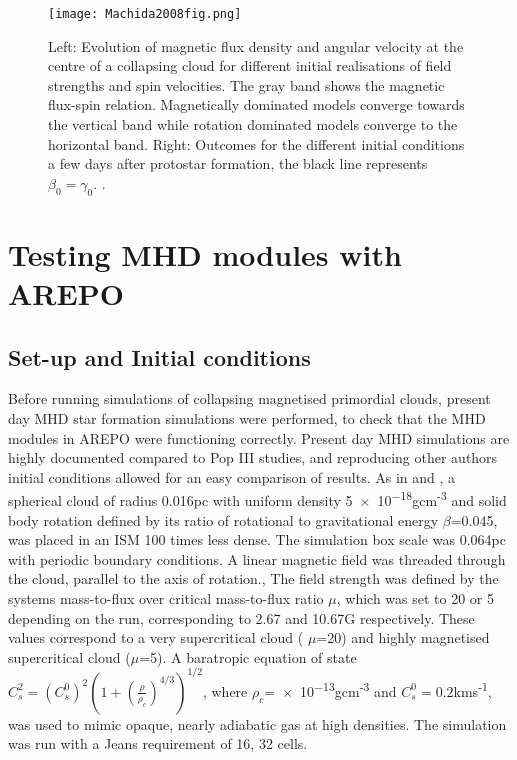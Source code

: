 \documentclass[11pt]{article}
\begin{document}
\begin{figure}[h!]
         \centering
		\texttt{[image: Machida2008fig.png]}
		\caption{Left: Evolution of magnetic flux density and angular velocity at the centre of a collapsing cloud for different initial realisations of field strengths and spin velocities. The gray band shows the magnetic flux-spin relation. Magnetically dominated models converge towards the vertical band while rotation dominated models converge to the horizontal band. Right: Outcomes for the different initial conditions a few days after protostar formation, the black line represents $\beta_{0}=\gamma_{0}$. \citep{Machida2008a}.}
		\label{fig:Machidafig}
\end{figure}





\section{Testing MHD modules with AREPO}
\label{MHDtest}
\subsection{Set-up and Initial conditions}
\label{sub:ics1}
Before running simulations of collapsing magnetised primordial clouds, present day MHD star formation simulations were performed, to check that the MHD modules in AREPO were functioning correctly. Present day MHD simulations are highly documented compared to Pop III studies, and reproducing other authors  initial conditions allowed for an easy comparison of results. As in \cite{Hennebelle2008} and \cite{Burzle2011}, a spherical cloud of radius 0.016pc with uniform density \num{5e-18}gcm\textsuperscript{-3} and solid body rotation defined by its ratio of rotational to gravitational energy $\beta$=0.045, was placed in an ISM 100 times less dense. The simulation box scale was 0.064pc with periodic boundary conditions. A linear magnetic field was threaded through the cloud, parallel to the axis of rotation., The field strength was defined by the systems mass-to-flux over critical mass-to-flux ratio $\mu$, which was set to 20 or 5 depending on the run, corresponding to 2.67 and 10.67G respectively. These values correspond to a very supercritical cloud ( $\mu$=20) and highly magnetised supercritical cloud ($\mu$=5). A baratropic equation of state $C_{s}^{2}=(C_{s}^{0})^{2}(1+(\frac{\rho}{\rho_{c}})^{4/3})^{1/2}$, where $\rho_{c}$=\num{e-13}gcm\textsuperscript{-3} and $C_{s}^{0}=0.2$kms\textsuperscript{-1}, was used to mimic opaque, nearly adiabatic gas at high densities. The simulation was run with a Jeans requirement of 16, 32 cells.
\end{document}
